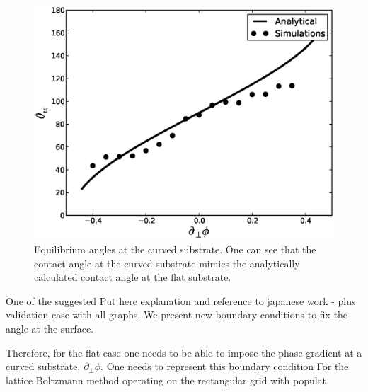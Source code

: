 \documentclass{article}
\begin{document}
\begin{figure}
\includegraphics[width=\textwidth]{Figures/main_curve_circle.eps}
\caption{Equilibrium angles at the curved substrate. One can see that the contact angle at the curved substrate mimics the analytically calculated contact angle at the flat substrate. \label{fig:equilibrium:droplet:curved}}
\end{figure}

One of the suggested 
{\color{red} Put here explanation and reference to japanese work - plus validation case with all graphs.}
We present new boundary conditions to fix the angle at the surface.


Therefore, for the flat case one needs to be able to impose the phase gradient at a curved substrate, $\partial_{\perp}\phi$. One needs to represent this boundary condition  For the lattice Boltzmann method operating on the rectangular grid with populat 
\end{document}
